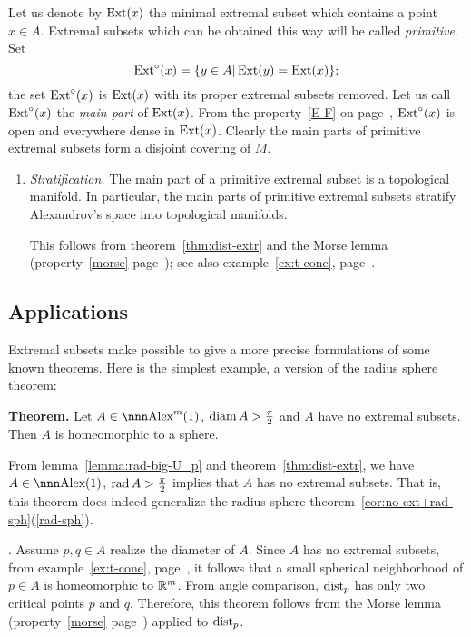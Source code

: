 \documentclass{article}
\begin{document}
Let us denote by $\operatorname{Ext}(x)$ the minimal extremal subset which contains a point
$x\in A$. 
Extremal subsets which can be obtained this way will be called
\emph{primitive}. 
Set $$\operatorname{Ext}^\circ(x)=\{y\in A|\operatorname{Ext}(y)=\operatorname{Ext}(x)\};$$
the set $\operatorname{Ext}^\circ(x)$ is $\operatorname{Ext}(x)$ with its proper extremal subsets removed.
Let us call $\operatorname{Ext}^\circ(x)$ the \emph{main part} of $\operatorname{Ext}(x)$.
From the property~\ref{E-F} on page~\pageref{E-F},  $\operatorname{Ext}^\circ(x)$ is open and everywhere
dense in $\operatorname{Ext}(x)$.
Clearly the main parts of primitive extremal subsets form a disjoint
covering of $M$.

\begin{enumerate}
\setcounter{enumi}{\value{extr-prop}}
\item \cite[3.8]{perelman-petrunin:extremal} {\it Stratification.}\label{strata} The main part of a primitive extremal subset is a
topological manifold. In particular, the main parts of primitive extremal subsets
stratify Alexandrov's space into topological manifolds. 

This follows from theorem~\ref{thm:dist-extr} and the Morse lemma (property~\ref{morse} page~\pageref{morse}); see also example~\ref{ex:t-cone}, page~\pageref{ex:t-cone}.
\setcounter{extr-prop}{\value{enumi}}
\end{enumerate}












\subsection{Applications}

Extremal subsets make possible to give a more precise formulations of some known theorems.
Here is the simplest example, a version of the radius sphere theorem:

\begin{thm}{\bf Theorem.}\label{thm:extr-sph}
Let $A\in\Alex^m(1)$, $\operatorname{diam} A>\tfrac\pi2$ and $A$ have no extremal subsets. Then $A$
is homeomorphic to a sphere.
\end{thm}

From lemma~\ref{lemma:rad-big-U_p} and theorem~\ref{thm:dist-extr}, we have
$A\in\Alex(1)$, $\operatorname{rad} A>\tfrac\pi2$ implies that $A$ has no extremal subsets. 
That is, 
this theorem does indeed generalize the radius sphere
theorem~\ref{cor:no-ext+rad-sph}(\ref{rad-sph}).

\Proof. Assume $p,q\in A$ realize the diameter of $A$.
Since  $A$ has no extremal subsets, from example~\ref{ex:t-cone}, page~\pageref{ex:t-cone}, it  follows that a small spherical neighborhood
of $p\in A$ is homeomorphic to $\mathbb{R}^m$. 
From angle comparison, $\operatorname{dist}_p$ has only two critical points $p$ and $q$. 
Therefore, this theorem follows from the Morse lemma  (property~\ref{morse} page~\pageref{morse}) applied to $\operatorname{dist}_p$. \qeds
\end{document}
